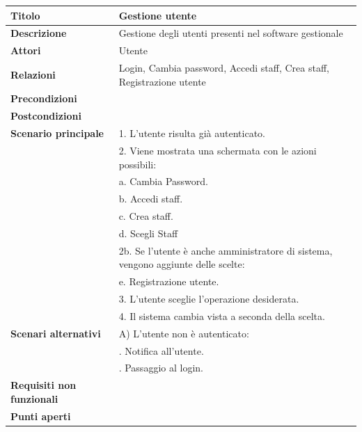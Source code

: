 \documentclass[a4paper]{article}
\begin{document}
\begin{center}
\begin{tabularx}{1\textwidth}{|l|X|}
    \hline
	\textbf{Titolo} & Gestione utente \\
	\hline
	\textbf{Descrizione} & Gestione degli utenti presenti nel software gestionale \\
	\hline
	\textbf{Attori} & Utente \\
	\hline
	\textbf{Relazioni} & Login, Cambia password, Accedi staff, Crea staff, Registrazione utente \\
	\hline
	\textbf{Precondizioni} &  \\
	\hline
	\textbf{Postcondizioni} &  \\
	\hline
	\textbf{Scenario principale} & 1. L'utente risulta già autenticato.\\
	                             & 2. Viene mostrata una schermata con le azioni possibili:\\
								 & \quad a. Cambia Password.\\
								 & \quad b. Accedi staff.\\
								 & \quad c. Crea staff.\\
								 & \quad d. Scegli Staff\\
								 & 2b. Se l'utente è anche amministratore di sistema, vengono aggiunte delle scelte:\\
								 & \quad e. Registrazione utente.\\
								 & 3. L'utente sceglie l'operazione desiderata.\\
								 & 4. Il sistema cambia vista a seconda della scelta.\\
	\hline
	\textbf{Scenari alternativi} & A) L'utente non è autenticato: \\
								 & \quad 1. Notifica all'utente.\\
								 & \quad 2. Passaggio al login.\\
	\hline
	\textbf{Requisiti non funzionali} & \\
	\hline
	\textbf{Punti aperti} & \\
	\hline
\end{tabularx}
\end{center}
\end{document}
